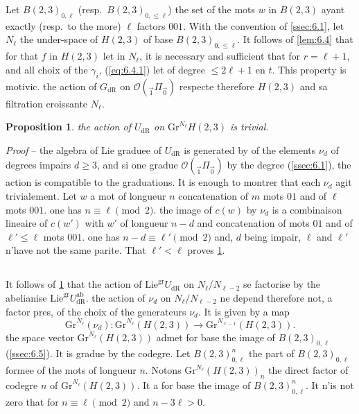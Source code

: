 \documentclass[11pt,a4paper]{article}
\theoremstyle{plain}
\newtheorem{proposition}[theorem]{Proposition}
\theoremstyle{definition}
\newcommand{\dR}{\mathrm{dR}}
\newcommand{\gr}{\mathrm{gr}}
\newcommand{\Gr}{\mathrm{Gr}}
\newcommand{\ab}{\mathrm{ab}}
\begin{document}
Let $B(2,3)_{0,\ell}$ (resp.~$B(2,3)_{0,\leq \ell}$) the set of the mots $w$ in $B(2,3)$ ayant exactly (resp.~to the more) $\ell$ factors $001$. With the convention of \ref{ssec:6.1}, let $N_{\ell}$ the under-space of $H(2,3)$ of base $B(2,3)_{0,\leq \ell}$. It follows of \ref{lem:6.4} that for that $f$ in $H(2,3)$ let in $N_{\ell}$, it is necessary and sufficient that for $r = \ell + 1$, and all choix of the $\gamma_i$, (\ref{eq:6.4.1}) let of degree $\leq 2\ell + 1$ en $t$. This property is motivic. the action of $G_{\dR}$ on $\mathcal{O}({}_{\vec{1}}\Pi_{\vec{0}})$ respecte therefore $H(2,3)$ and sa filtration croissante $N_{\ell}$.

\begin{proposition}\label{prop:6.6}
the action of $U_{\dR}$ on $\Gr^{N_{\ell}} H(2,3)$ is trivial.
\end{proposition}

\noindent \textit{Proof} -- the algebra of Lie graduee of $U_{\dR}$ is generated by of the elements $\nu_d$ of degrees impairs $d \geq 3$, and si one gradue $\mathcal{O}({}_{\vec{1}}\Pi_{\vec{0}})$ by the degree (\ref{ssec:6.1}), the action is compatible to the graduations. It is enough to montrer that each $\nu_d$ agit trivialement. Let $w$ a mot of longueur $n$ concatenation of $m$ mots $01$ and of $\ell$ mots $001$. one has $n \equiv \ell \pmod{2}$. the image of $c(w)$ by $\nu_d$ is a combinaison lineaire of $c(w')$ with $w'$ of longueur $n - d$ and concatenation of mots $01$ and of $\ell' \leq \ell$ mots $001$. one has $n - d \equiv \ell' \pmod{2}$ and, $d$ being impair, $\ell$ and $\ell'$ n'have not the same parite. That $\ell' < \ell$ proves \ref{prop:6.6}.

\subsection{}\label{ssec:6.7}

It follows of \ref{prop:6.6} that the action of $\mathrm{Lie}^{\gr} U_{\dR}$ on $N_{\ell}/N_{\ell-2}$ se factorise by the abelianise $\mathrm{Lie}^{\gr} U_{\dR}^{\ab}$. the action of $\nu_d$ on $N_{\ell}/N_{\ell-2}$ ne depend therefore not, a factor pres, of the choix of the generateurs $\nu_d$. It is given by a map
\begin{equation}\label{eq:6.7.1}
\Gr^{N_{\ell}}(\nu_d): \Gr^{N_{\ell}}(H(2,3)) \to \Gr^{N_{\ell-1}}(H(2,3)).
\end{equation}
the space vector $\Gr^{N_{\ell}}(H(2,3))$ admet for base the image of $B(2,3)_{0,\ell}$ (\ref{ssec:6.5}). It is gradue by the codegre. Let $B(2,3)_{0,\ell}^n$ the part of $B(2,3)_{0,\ell}$ formee of the mots of longueur $n$. Notons $\Gr^{N_{\ell}}(H(2,3))_n$ the direct factor of codegre $n$ of $\Gr^{N_{\ell}}(H(2,3))$. It a for base the image of $B(2,3)_{0,\ell}^n$. It n'is not zero that for $n \equiv \ell \pmod{2}$ and $n - 3\ell > 0$.
\end{document}
